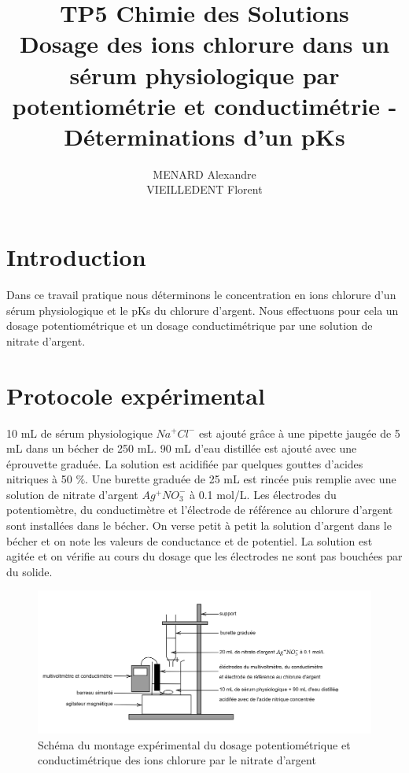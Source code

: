\documentclass[12pt]{article}
\title{\textbf{TP5 Chimie des Solutions} \\ Dosage des ions chlorure dans un sérum physiologique par potentiométrie et conductimétrie - Déterminations d'un pKs}
\author{MENARD Alexandre \\ VIEILLEDENT Florent}
\begin{document}
\maketitle

\section*{Introduction}

Dans ce travail pratique nous déterminons le concentration en ions chlorure d'un sérum physiologique et le pKs du chlorure d'argent.
Nous effectuons pour cela un dosage potentiométrique et un dosage conductimétrique par une solution de nitrate d'argent. 

\newpage

\section{Protocole expérimental}

10 mL de sérum physiologique $Na^+Cl^-$ est ajouté grâce à une pipette jaugée de 5 mL dans un bécher de 250 mL.
90 mL d'eau distillée est ajouté avec une éprouvette graduée.
La solution est acidifiée par quelques gouttes d'acides nitriques à 50 $\%$.
Une burette graduée de 25 mL est rincée puis remplie avec une solution de nitrate d'argent $Ag^+ NO_3^-$ à 0.1 mol/L.
Les électrodes du potentiomètre, du conductimètre et l'électrode de référence au chlorure d'argent sont installées dans le bécher.
On verse petit à petit la solution d'argent dans le bécher et on note les valeurs de conductance et de potentiel. 
La solution est agitée et on vérifie au cours du dosage que les électrodes ne sont pas bouchées par du solide.

\begin{figure}[h!]
    \begin{center}
        \includegraphics[scale=0.2]{Schema_montage.png}
        \caption{Schéma du montage expérimental du dosage potentiométrique et conductimétrique des ions chlorure par le nitrate d'argent}
        \label{img1:Schema_montage}
    \end{center}
\end{figure}
\end{document}
